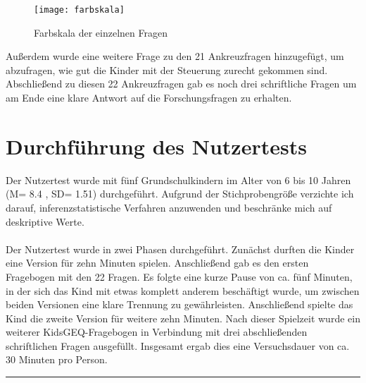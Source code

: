 \begin{figure}[htb]
	\centering
	\texttt{[image: farbskala]}
	\caption{Farbskala der einzelnen Fragen\label{fig:farbskala}}
\end{figure}

Außerdem wurde eine weitere Frage zu den 21 Ankreuzfragen hinzugefügt, um abzufragen, wie gut die Kinder mit der Steuerung zurecht gekommen sind. Abschließend zu diesen 22 Ankreuzfragen gab es noch drei schriftliche Fragen um am Ende eine klare Antwort auf die Forschungsfragen zu erhalten.
\section{Durchführung des Nutzertests} %
Der Nutzertest wurde mit fünf Grundschulkindern im Alter von 6 bis 10 Jahren (M= 8.4 , SD= 1.51) durchgeführt. Aufgrund der Stichprobengröße verzichte ich darauf, inferenzstatistische Verfahren anzuwenden und beschränke mich auf deskriptive Werte.\\
\\
Der Nutzertest wurde in zwei Phasen durchgeführt. Zunächst durften die Kinder eine Version für zehn Minuten spielen. Anschließend gab es den ersten Fragebogen mit den 22 Fragen. Es folgte eine kurze Pause von ca. fünf Minuten, in der sich das Kind mit etwas komplett anderem beschäftigt wurde, um zwischen beiden Versionen eine klare Trennung zu gewährleisten. Anschließend  spielte das Kind die zweite Version für weitere zehn Minuten. Nach dieser Spielzeit wurde ein weiterer KidsGEQ-Fragebogen in Verbindung mit drei abschließenden schriftlichen Fragen ausgefüllt. Insgesamt ergab dies eine Versuchsdauer von ca. 30 Minuten pro Person.


\hfil\rule{0.4\textwidth}{0.4pt}